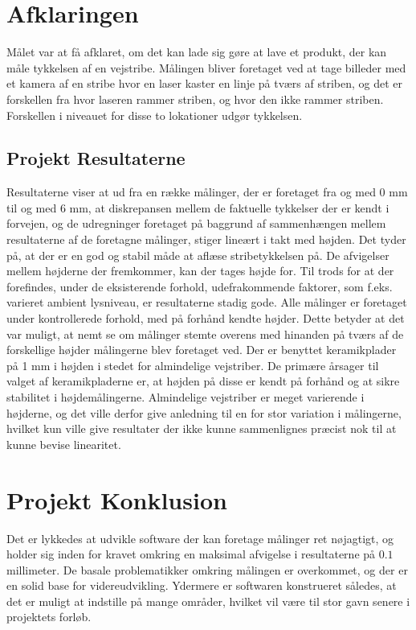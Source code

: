 \section{Afklaringen}
Målet var at få afklaret, om det kan lade sig gøre at lave et produkt, der kan måle tykkelsen af en vejstribe.
Målingen bliver foretaget ved at tage billeder med et kamera af en stribe hvor en laser kaster en linje på tværs af striben, og det er forskellen fra hvor laseren rammer striben, og hvor den ikke rammer striben. Forskellen i niveauet for disse to lokationer udgør tykkelsen.

\subsection{Projekt Resultaterne}
Resultaterne viser at ud fra en række målinger, der er foretaget fra og med 0 mm til og med 6 mm, at diskrepansen mellem de faktuelle tykkelser der er kendt i forvejen, og de udregninger foretaget på baggrund af sammenhængen mellem resultaterne af de foretagne målinger, stiger lineært i takt med højden.
Det tyder på, at der er en god og stabil måde at aflæse stribetykkelsen på. De afvigelser mellem højderne der fremkommer, kan der tages højde for. Til trods for at der forefindes, under de eksisterende forhold, udefrakommende faktorer, som f.eks. varieret ambient lysniveau, er resultaterne stadig gode. Alle målinger er foretaget under kontrollerede forhold, med på forhånd kendte højder. Dette betyder at det var muligt, at nemt se om målinger stemte overens med hinanden på tværs af de forskellige højder målingerne blev foretaget ved.
Der er benyttet keramikplader på 1 mm i højden i stedet for almindelige vejstriber. De primære årsager til valget af keramikpladerne er, at højden på disse er kendt på forhånd og at sikre stabilitet i højdemålingerne. Almindelige vejstriber er meget varierende i højderne, og det ville derfor give anledning til en for stor variation i målingerne, hvilket kun ville give resultater der ikke kunne sammenlignes præcist nok til at kunne bevise linearitet.

\section{Projekt Konklusion}
Det er lykkedes at udvikle software der kan foretage målinger ret nøjagtigt, og holder sig inden for kravet omkring en maksimal afvigelse i resultaterne på $0.1$ millimeter. De basale problematikker omkring målingen er overkommet, og der er en solid base for videreudvikling. Ydermere er softwaren konstrueret således, at det er muligt at indstille på mange områder, hvilket vil være til stor gavn senere i projektets forløb.

